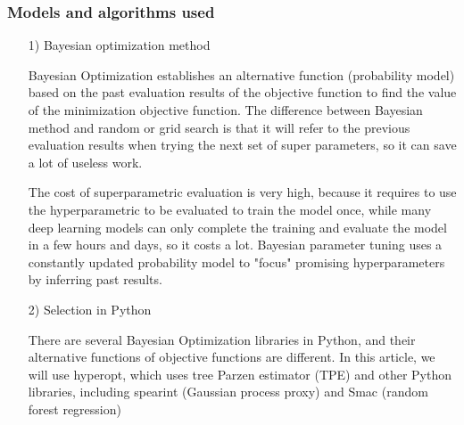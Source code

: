 \documentclass{apmcmthesis}
\begin{document}
\subsubsection{Models and algorithms used}
\begin{itemize}
\item [1)]Bayesian optimization method\par
\qquad Bayesian Optimization establishes an alternative function (probability model) based on the past evaluation results of the objective function to find the value of the minimization objective function. The difference between Bayesian method and random or grid search is that it will refer to the previous evaluation results when trying the next set of super parameters, so it can save a lot of useless work.\par
\qquad The cost of superparametric evaluation is very high, because it requires to use the hyperparametric to be evaluated to train the model once, while many deep learning models can only complete the training and evaluate the model in a few hours and days, so it costs a lot. Bayesian parameter tuning uses a constantly updated probability model to "focus" promising hyperparameters by inferring past results.\par

\item [2)]Selection in Python\par
\qquad There are several Bayesian Optimization libraries in Python, and their alternative functions of objective functions are different. In this article, we will use hyperopt, which uses tree Parzen estimator (TPE) and other Python libraries, including spearint (Gaussian process proxy) and Smac (random forest regression)\par


\end{itemize}
\end{document}
